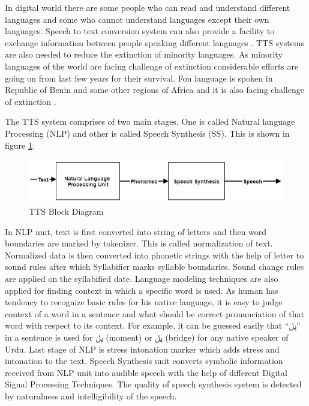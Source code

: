 In digital world there are some people who can read and understand different languages and some who cannot understand
languages except their own languages. Speech to text conversion system can also provide a facility to exchange information
between people speaking different languages \cite{khilari2015review}. TTS systems are also needed to reduce
the extinction of minority languages. As minority languages of the world are facing challenge of extinction considerable
efforts are going on from last few years for their survival. Fon language is spoken in Republic of Benin and some other
regions of Africa and it is also facing challenge of extinction \cite{dagba2014text}.



The TTS system comprises of two main stages. One is called Natural language Processing (NLP) and
other is called Speech Synthesis (SS). This is shown in figure \ref{fig:TTS Block Diagram}.

\begin{center}
\begin{figure}[hbtp]
\centering
  \includegraphics[width=\linewidth]{images/tts_bd.jpg}
  \caption{TTS Block Diagram}
  \label{fig:TTS Block Diagram}
\end{figure}

\end{center}

In NLP unit, text is first converted into string of letters and then word boundaries are marked by
tokenizer. This is called normalization of text. Normalized data is then converted into phonetic strings
with the help of letter to sound rules after which Syllabifier marks syllable boundaries. Sound change
rules are applied on the syllabified date. Language modeling techniques are also applied for finding
context in which a specific word is used. As human has tendency to recognize basic rules for his native
language, it is easy to judge context of a word in a sentence and what should be correct pronunciation of
that word with respect to its context. For example, it can be guessed easily that \enquote{\texturdu{پل}} in a sentence is used
for \texturdu{پل} (moment) or \texturdu{پل} (bridge) for any native speaker of Urdu. Last stage of NLP is stress intonation
marker which adds stress and intonation to the text. Speech Synthesis unit converts symbolic information
received from NLP unit into audible speech with the help of different Digital Signal Processing
Techniques. The quality of speech synthesis system is detected by naturalness and intelligibility of the speech.

